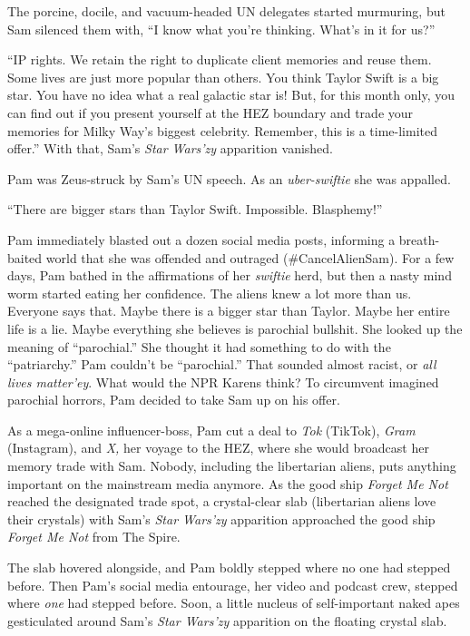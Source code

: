 The porcine, docile, and vacuum-headed UN delegates started murmuring,
but Sam silenced them with, ``I know what you're thinking. What's in it
for us?''

``IP rights. We retain the right to duplicate client memories and reuse
them. Some lives are just more popular than others. You think Taylor
Swift is a big star. You have no idea what a real galactic star is! But,
for this month only, you can find out if you present yourself at the HEZ
boundary and trade your memories for Milky Way's biggest celebrity.
Remember, this is a time-limited offer.'' With that, Sam's \emph{Star
Wars'zy} apparition vanished.

Pam was Zeus-struck by Sam's UN speech. As an
\emph{uber-swiftie} she was appalled.

``There are bigger stars than Taylor Swift. Impossible. Blasphemy!''

Pam immediately blasted out a dozen social media posts, informing a
breath-baited world that she was offended and outraged
(\#CancelAlienSam). For a few days, Pam bathed in the affirmations of
her \emph{swiftie} herd, but then a nasty mind worm started eating her
confidence. The aliens knew a lot more than us. Everyone says that.
Maybe there is a bigger star than Taylor. Maybe her entire life is a
lie. Maybe everything she believes is parochial bullshit. She looked up
the meaning of ``parochial.'' She thought it had something to do with
the ``patriarchy.'' Pam couldn't be ``parochial.'' That sounded almost
racist, or \emph{all lives matter'ey}. What would the NPR Karens think?
To circumvent imagined parochial horrors, Pam decided to take Sam up on
his offer.

As a mega-online influencer-boss, Pam cut a deal to \emph{Tok} (TikTok),
\emph{Gram} (Instagram), and \emph{X,} her voyage to the HEZ, where she
would broadcast her memory trade with Sam. Nobody, including the
libertarian aliens, puts anything important on the mainstream media
anymore. As the good ship \emph{Forget Me Not} reached the designated
trade spot, a crystal-clear slab (libertarian aliens love their
crystals) with Sam's \emph{Star Wars'zy} apparition approached the good
ship \emph{Forget Me Not} from The Spire.

The slab hovered alongside, and Pam boldly stepped where no one had
stepped before. Then Pam's social media entourage, her video and podcast
crew, stepped where \emph{one} had stepped before. Soon, a little
nucleus of self-important naked apes gesticulated around Sam's
\emph{Star Wars'zy} apparition on the floating crystal slab.


